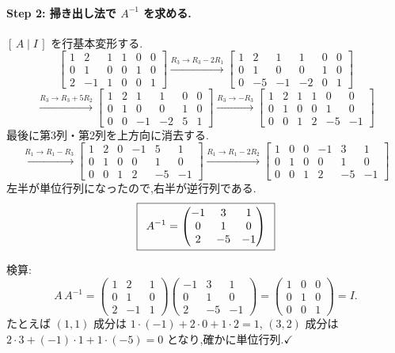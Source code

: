 \documentclass[11pt,a4paper]{article}
\begin{document}
\paragraph{Step 2: 掃き出し法で $A^{-1}$ を求める.}
$[\,A\mid I\,]$ を行基本変形する.
\[
\left[\begin{array}{ccc|ccc}
1&2&1&1&0&0\\
0&1&0&0&1&0\\
2&-1&1&0&0&1
\end{array}\right]
\xrightarrow{R_3\to R_3-2R_1}
\left[\begin{array}{ccc|ccc}
1&2&1&1&0&0\\
0&1&0&0&1&0\\
0&-5&-1&-2&0&1
\end{array}\right]
\]
\[
\xrightarrow{R_3\to R_3+5R_2}
\left[\begin{array}{ccc|ccc}
1&2&1&1&0&0\\
0&1&0&0&1&0\\
0&0&-1&-2&5&1
\end{array}\right]
\xrightarrow{R_3\to -R_3}
\left[\begin{array}{ccc|ccc}
1&2&1&1&0&0\\
0&1&0&0&1&0\\
0&0&1&2&-5&-1
\end{array}\right]
\]
最後に第3列・第2列を上方向に消去する.
\[
\xrightarrow{R_1\to R_1-R_3}
\left[\begin{array}{ccc|ccc}
1&2&0&-1&5&1\\
0&1&0&0&1&0\\
0&0&1&2&-5&-1
\end{array}\right]
\xrightarrow{R_1\to R_1-2R_2}
\left[\begin{array}{ccc|ccc}
1&0&0&-1&3&1\\
0&1&0&0&1&0\\
0&0&1&2&-5&-1
\end{array}\right]
\]
左半が単位行列になったので,右半が逆行列である.
\[
\ans{\
A^{-1}=\begin{pmatrix}-1&3&1\\0&1&0\\2&-5&-1\end{pmatrix}\ }
\]

検算:
\[
A\,A^{-1}=\begin{pmatrix}1&2&1\\0&1&0\\2&-1&1\end{pmatrix}
\begin{pmatrix}-1&3&1\\0&1&0\\2&-5&-1\end{pmatrix}
=\begin{pmatrix}1&0&0\\0&1&0\\0&0&1\end{pmatrix}=I.
\]
たとえば $(1,1)$ 成分は $1\cdot(-1)+2\cdot0+1\cdot2=1$,
$(3,2)$ 成分は $2\cdot3+(-1)\cdot1+1\cdot(-5)=0$ となり,確かに単位行列.$\checkmark$
\end{document}
